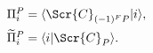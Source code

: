 \begin{equation}
\begin{array}{l}
\\
\Pi_{i}^P=\langle \Scr{C}_{(-1)^FP}|i\rangle,
\\[0.2cm]
\widetilde{\Pi}_i^P=\langle i|\Scr{C}_P\rangle.
\\[0.2cm]
\end{array}
\label{pairi}
\end{equation}

